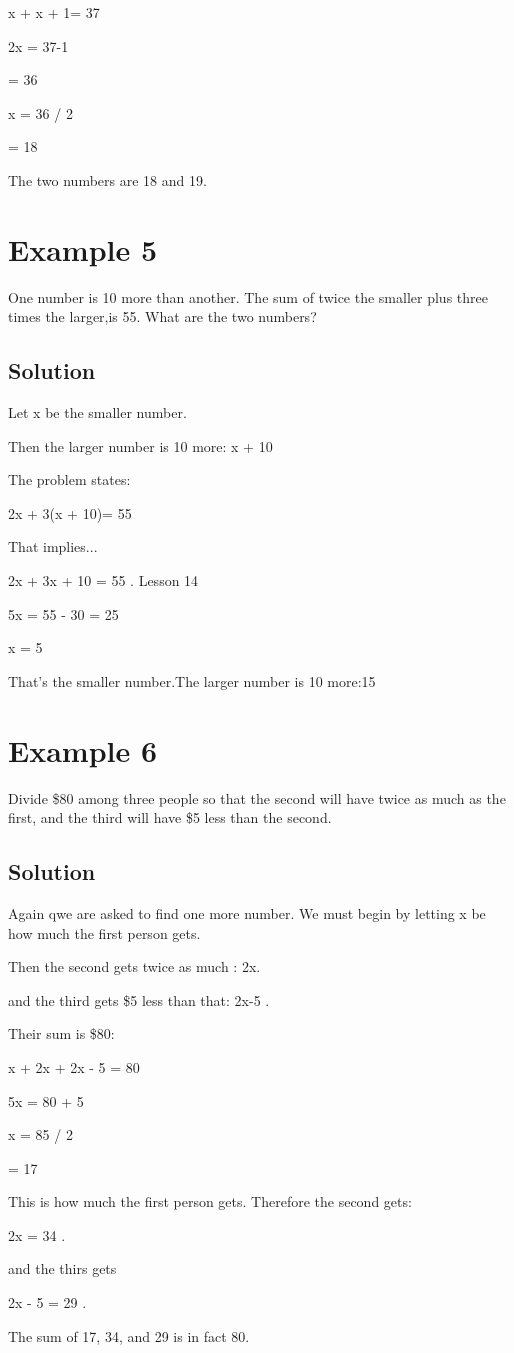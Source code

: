 \documentclass[12pt]{article}%
\begin{document}
x + x + 1= 37 

2x = 37-1

= 36 

x = 36 / 2

= 18   

The two numbers are 18 and 19. 

\section{Example 5}

One number is 10 more than another. The sum of twice the smaller plus three times the larger,is 55. What are the two numbers?

\subsection{Solution}

Let x be the smaller number.

Then the larger number is 10 more: x + 10

The problem states: 

2x + 3(x + 10)= 55 

That implies...

2x + 3x + 10 = 55 . Lesson 14 

5x = 55 - 30 = 25 

x = 5 

That's the smaller number.The larger number is 10 more:15 

\section{Example 6} 

Divide \$80 among three people so that the second will have twice as much as the first, and the third will have \$5 less than the second.

\subsection{Solution}

Again qwe are asked to find one more number. We must begin by letting x be how much the first person gets.

Then the second gets twice as much : 2x. 

and the third gets \$5 less than that: 2x-5 .

Their sum is \$80: 

x + 2x + 2x - 5 = 80 

5x = 80 + 5

x = 85 / 2 

= 17 

This is how much the first person gets. Therefore the second gets: 

2x = 34 . 

and the thirs gets 

2x - 5 = 29 . 

The sum of 17, 34, and 29 is in fact 80. 


       
                       
                       
  
  
  
  
  
  
  
  
  
  
\end{document}
